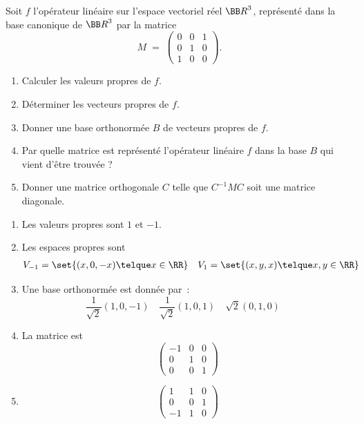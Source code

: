 \documentclass[12pt,french,oneside,a4paper]{memoir} %
\begin{document}
\begin{exo}%
Soit $f$ l'opérateur linéaire sur l'espace vectoriel réel ${\BB R}^3$, 
représenté dans la base canonique de ${\BB R}^3$ par la matrice
\begin{equation*}
M \;=\; \left( \begin{array}{ccc}
0 &0 &1 \\
0 &1 &0 \\
1 &0 &0 \end{array} \right).
\end{equation*}
\begin{enumerate}
\item Calculer les valeurs propres de $f$. 
\item Déterminer les vecteurs propres de $f$. 
\item Donner une base orthonormée $B$ de vecteurs propres de $f$. 
\item Par quelle matrice est représenté l'opérateur linéaire $f$ dans 
la base $B$ qui vient d'être trouvée ?
\item Donner une matrice orthogonale $C$ telle que $C^{-1}MC$ soit 
une matrice diagonale.
\end{enumerate}
\begin{correction}
  \begin{enumerate}
  \item Les valeurs propres sont $1$ et $-1$.
  \item Les espaces propres sont
    \begin{align*}
      V_{-1} &= \set{(x,0,-x) \telque x \in \RR} &
      V_{1} &= \set{(x,y,x) \telque x,y \in \RR}
    \end{align*}
  \item Une base orthonormée est donnée par~:
    \begin{equation*}
      \frac{1}{\sqrt 2}(1,0,-1) \quad
      \frac{1}{\sqrt 2}(1,0,1) \quad
      {\sqrt 2}(0,1,0) \quad
    \end{equation*}

  \item La matrice est
    \begin{equation*}
      \begin{pmatrix}
        -1 & 0 & 0 \\
        0  & 1 & 0 \\
        0 & 0 & 1
      \end{pmatrix}
    \end{equation*}

  \item
    \begin{equation*}
      \begin{pmatrix}
        1  & 1 & 0 \\
        0  & 0 & 1 \\
        -1 & 1 & 0
      \end{pmatrix}
    \end{equation*}
  \end{enumerate}
\end{correction}
\end{exo}
\end{document}
